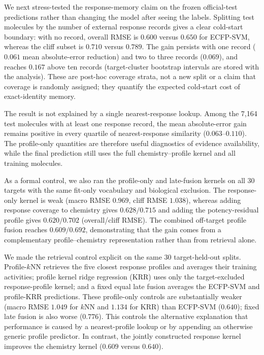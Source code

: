 \documentclass[manuscript,nonacm]{acmart}
\begin{document}
We next stress-tested the response-memory claim on the frozen official-test
predictions rather than changing the model after seeing the labels.  Splitting
test molecules by the number of external response records gives a clear
cold-start boundary: with no record, overall RMSE is $0.600$ versus $0.650$
for ECFP-SVM, whereas the cliff subset is $0.710$ versus $0.789$.  The gain
persists with one record ($0.061$ mean absolute-error reduction) and two to
three records ($0.069$), and reaches $0.167$ above ten records (target-cluster
bootstrap intervals are stored with the analysis).  These are post-hoc
coverage strata, not a new split or a claim that coverage is randomly
assigned; they quantify the expected cold-start cost of exact-identity memory.

The result is not explained by a single nearest-response lookup.  Among the
7,164 test molecules with at least one response record, the mean absolute-error
gain remains positive in every quartile of nearest-response similarity
($0.063$--$0.110$).  The profile-only quantities are therefore useful
diagnostics of evidence availability, while the final prediction still uses
the full chemistry--profile kernel and all training molecules.

As a formal control, we also ran the profile-only and late-fusion kernels on
all 30 targets with the same fit-only vocabulary and biological exclusion.
The response-only kernel is weak (macro RMSE $0.969$, cliff RMSE $1.038$),
whereas adding response coverage to chemistry gives $0.628/0.715$ and adding
the potency-residual profile gives $0.620/0.702$ (overall/cliff RMSE).  The
combined off-target profile fusion reaches $0.609/0.692$, demonstrating that
the gain comes from a complementary profile--chemistry representation rather
than from retrieval alone.

We made the retrieval control explicit on the same 30 target-held-out splits.
Profile-$k$NN retrieves the five closest response profiles and averages their
training activities; profile kernel ridge regression (KRR) uses only the
target-excluded response-profile kernel; and a fixed equal late fusion averages
the ECFP-SVM and profile-KRR predictions.  These profile-only controls are
substantially weaker (macro RMSE $1.049$ for $k$NN and $1.134$ for KRR) than
ECFP-SVM ($0.640$); fixed late fusion is also worse ($0.776$).  This controls
the alternative explanation that performance is caused by a nearest-profile
lookup or by appending an otherwise generic profile predictor.  In contrast,
the jointly constructed response kernel improves the chemistry kernel
($0.609$ versus $0.640$).
\end{document}
